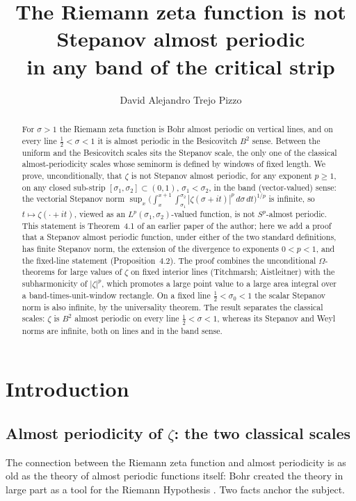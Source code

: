 \documentclass[11pt]{amsart}
\title[$\zeta$ is not Stepanov a.p.]{The Riemann zeta function is not Stepanov almost periodic\\
in any band of the critical strip}
\author{David Alejandro Trejo Pizzo}
\theoremstyle{definition}
\theoremstyle{remark}
\begin{document}
\begin{abstract}
For $\sigma>1$ the Riemann zeta function is Bohr almost periodic on
vertical lines, and on every line $\tfrac12<\sigma<1$ it is almost periodic in
the Besicovitch $B^2$ sense. Between the uniform and the Besicovitch
scales sits the Stepanov scale, the only one of the classical
almost-periodicity scales whose seminorm is defined by windows of fixed
length.
We prove, unconditionally, that $\zeta$ is not Stepanov almost periodic,
for any exponent $p\geq1$, on any closed sub-strip
$[\sigma_1,\sigma_2]\subset(0,1)$, $\sigma_1<\sigma_2$, in the band (vector-valued)
sense: the vectorial Stepanov norm
$\sup_x\bigl(\int_x^{x+1}\int_{\sigma_1}^{\sigma_2}
|\zeta(\sigma+it)|^p\,d\sigma\,dt\bigr)^{1/p}$ is infinite, so
$t\mapsto\zeta(\cdot+it)$, viewed as an
$L^p(\sigma_1,\sigma_2)$-valued function, is not $S^p$-almost periodic.
This statement is Theorem~4.1 of an earlier paper of the author; here
we add a proof that a Stepanov almost periodic function, under either of
the two standard definitions, has finite Stepanov norm, the extension of
the divergence to exponents $0<p<1$, and the fixed-line statement
(Proposition~4.2).
The proof combines the unconditional $\Omega$-theorems for large values
of $\zeta$ on fixed interior lines (Titchmarsh; Aistleitner) with the
subharmonicity of $|\zeta|^p$, which promotes a large point value to a
large area integral over a band-times-unit-window rectangle. On a
fixed line $\tfrac12<\sigma_0<1$ the scalar Stepanov norm is also
infinite, by the universality theorem. The result separates the
classical scales: $\zeta$ is $B^2$ almost periodic on every line
$\tfrac12<\sigma<1$, whereas its Stepanov and Weyl norms are infinite,
both on lines and in the band sense.
\end{abstract}

\maketitle

\tableofcontents
\newpage

\section{Introduction}\label{sec:intro}

\subsection{Almost periodicity of \texorpdfstring{$\zeta$}{zeta}: the two classical scales}
The connection between the Riemann zeta function and almost periodicity
is as old as the theory of almost periodic functions itself: Bohr
created the theory in large part as a tool for the Riemann Hypothesis
\cite{Bohr22}. Two facts anchor the subject.
\end{document}
